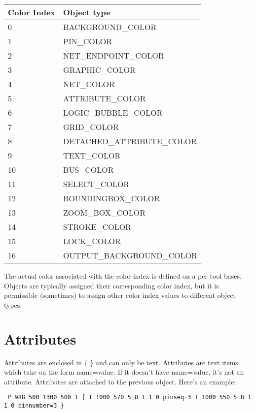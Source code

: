 \documentclass{article}
\begin{document}
\begin{table}[h]
\begin{tabular}{|l|l|} \hline
Color Index	& Object type \\ \hline
\hline
0 		& BACKGROUND\_COLOR 		\\ \hline 
1 		& PIN\_COLOR 			\\ \hline
2 		& NET\_ENDPOINT\_COLOR 		\\ \hline 
3 		& GRAPHIC\_COLOR		\\ \hline
4 		& NET\_COLOR 			\\ \hline                      
5 		& ATTRIBUTE\_COLOR  		\\ \hline
6 		& LOGIC\_BUBBLE\_COLOR 		\\ \hline 
7 		& GRID\_COLOR 			\\ \hline 
8 		& DETACHED\_ATTRIBUTE\_COLOR    \\ \hline 
9 		& TEXT\_COLOR			\\ \hline 
10 		& BUS\_COLOR 			\\ \hline 
11		& SELECT\_COLOR			\\ \hline
12 		& BOUNDINGBOX\_COLOR		\\ \hline
13 		& ZOOM\_BOX\_COLOR 		\\ \hline 
14 		& STROKE\_COLOR			\\ \hline
15 		& LOCK\_COLOR			\\ \hline
16 		& OUTPUT\_BACKGROUND\_COLOR     \\ \hline 
\end{tabular}
\end{table}

The actual color associated with the color index is defined on a per
tool bases.  Objects are typically assigned their corresponding color
index, but it is permissible (sometimes) to assign other color index
values to different object types.


\section{Attributes}

Attributes are enclosed in \{ \} and can only be text.  Attributes are text
items which take on the form name=value.  If it doesn't have name=value,
it's not an attribute.  Attributes are attached to the previous object.
Here's an example:
       
{\tt 
P 988 500 1300 500 1\newline
\{\newline
T 1000 570 5 8 1 1 0\newline
pinseq=3\newline
T 1000 550 5 8 1 1 0\newline
pinnumber=3\newline
\}\newline
}
\end{document}
